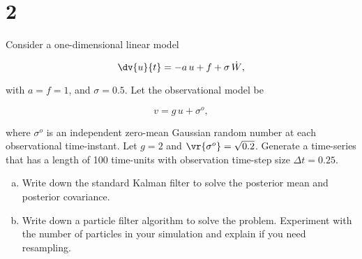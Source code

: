 \section{2}

Consider a one-dimensional linear model

\begin{equation}
	\dv{u}{t} = -a\,u + f + \sigma\,\dot{W},
\end{equation}

with $a = f = 1$, and $\sigma = 0.5$. Let the observational model be

\begin{equation}
	v = g\,u + \sigma^{o},
\end{equation}

where $\sigma^{o}$ is an independent zero-mean Gaussian random number at each observational time-instant. Let $g = 2$ and $\vr{\sigma^{o}} = \sqrt{0.2}$. Generate a time-series that has a length of 100 time-units with observation time-step size $\Delta t = 0.25$.

\begin{enumerate}[a)]
	\item Write down the standard Kalman filter to solve the posterior mean and posterior covariance.
	
	\item Write down a particle filter algorithm to solve the problem. Experiment with the number of particles in your simulation and explain if you need resampling.
\end{enumerate}
